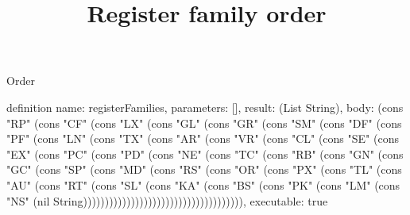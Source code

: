 \begin{lexlean}{Order}
\title{Register family order}
\begin{semanticmodule}
definition{
  name: registerFamilies,
  parameters: [],
  result: (List String),
  body: (cons "RP" (cons "CF" (cons "LX" (cons "GL" (cons "GR" (cons "SM" (cons "DF" (cons "PF" (cons "LN" (cons "TX" (cons "AR" (cons "VR" (cons "CL" (cons "SE" (cons "EX" (cons "PC" (cons "PD" (cons "NE" (cons "TC" (cons "RB" (cons "GN" (cons "GC" (cons "SP" (cons "MD" (cons "RS" (cons "OR" (cons "PX" (cons "TL" (cons "AU" (cons "RT" (cons "SL" (cons "KA" (cons "BS" (cons "PK" (cons "LM" (cons "NS" (nil String))))))))))))))))))))))))))))))))))))),
  executable: true
}
\end{semanticmodule}
\end{lexlean}

